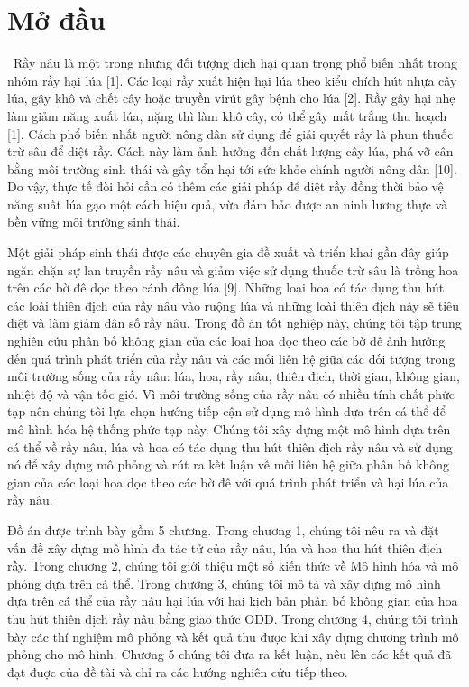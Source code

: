 \documentclass[13pt]{extreport}
\begin{document}
\tableofcontents
\newpage


\newpage
{}
\chapter*{Mở đầu}\
Rầy nâu là một trong những đối tượng dịch hại quan trọng phổ biến nhất trong nhóm rầy hại lúa [1]. Các loại rầy xuất hiện hại lúa theo kiểu chích hút nhựa cây lúa, gây khô và chết cây hoặc truyền virút gây bệnh cho lúa [2]. Rầy gây hại nhẹ làm giảm năng xuất lúa, nặng thì làm khô cây, có thể gây mất trắng thu hoạch [1]. Cách phổ biến nhất người nông dân sử dụng để giải quyết rầy là phun thuốc trừ sâu để diệt rầy. Cách này làm ảnh hưởng đến chất lượng cây lúa, phá vỡ cân bằng môi trường sinh thái và gây tổn hại tới sức khỏe chính người nông dân [10]. Do vậy, thực tế đòi hỏi cần có thêm các giải pháp để diệt rầy đồng thời bảo vệ năng suất lúa gạo một cách hiệu quả, vừa đảm bảo được an ninh lương thực và bền vững môi trường sinh thái. 

Một giải pháp sinh thái được các chuyên gia đề xuất và triển khai gần đây giúp ngăn chặn sự lan truyền rầy nâu và giảm việc sử dụng thuốc trừ sâu là trồng hoa trên các bờ đê dọc theo cánh đồng lúa [9]. Những loại hoa có tác dụng thu hút các loài thiên địch của rầy nâu vào ruộng lúa và những loài thiên địch này sẽ tiêu diệt và làm giảm dân số rầy nâu. Trong đồ án tốt nghiệp này, chúng tôi tập trung nghiên cứu phân bố không gian của các loại hoa dọc theo các bờ đê ảnh hưởng đến quá trình phát triển của rầy nâu và các mối liên hệ giữa các đối tượng trong môi trường sống của rầy nâu: lúa, hoa, rầy nâu, thiên địch, thời gian, không gian, nhiệt độ và vận tốc gió. Vì môi trường sống của rầy nâu có nhiều tính chất phức tạp nên chúng tôi lựa chọn hướng tiếp cận sử dụng mô hình dựa trên cá thể để mô hình hóa hệ thống phức tạp này. Chúng tôi xây dựng một mô hình dựa trên cá thể về rầy nâu, lúa và hoa có tác dụng thu hút thiên địch rầy nâu và sử dụng nó để xây dựng mô phỏng và rút ra kết luận về mối liên hệ giữa phân bố không gian của các loại hoa dọc theo các bờ đê với quá trình phát triển và hại lúa của rầy nâu.

Đồ án được trình bày gồm 5 chương. Trong chương 1, chúng tôi nêu ra và đặt vấn đề xây dựng mô hình đa tác tử của rầy nâu, lúa và hoa thu hút thiên địch rầy. Trong chương 2, chúng tôi giới thiệu một số kiến thức về Mô hình hóa và mô phỏng dựa trên cá thể. Trong chương 3, chúng tôi mô tả và xây dựng mô hình dựa trên cá thể của rầy nâu hại lúa với hai kịch bản phân bố không gian của hoa thu hút thiên địch rầy nâu bằng giao thức ODD. Trong chương 4, chúng tôi trình bày các thí nghiệm mô phỏng và kết quả thu được khi xây dựng chương trình mô phỏng cho mô hình. Chương 5 chúng tôi đưa ra kết luận, nêu lên các kết quả đã đạt đuợc của đề tài và chỉ ra các hướng nghiên cứu tiếp theo.
\end{document}
